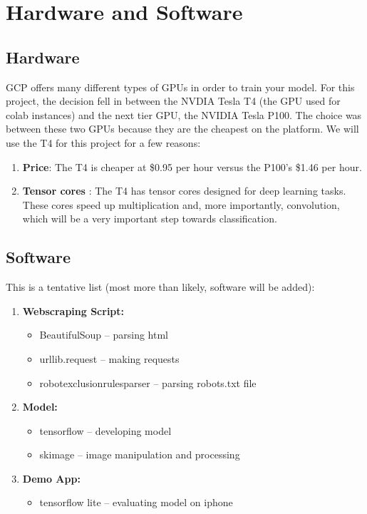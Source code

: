 \section*{Hardware and Software}
\subsection*{Hardware}
GCP offers many different types of GPUs in order to train your model. For this project, the decision fell in between 
the NVDIA Tesla T4 (the GPU used for colab instances) and the next tier GPU, the NVIDIA Tesla P100. The choice was between these 
two GPUs because they are the cheapest on the platform. We will use the T4 for this project for a few reasons:
\begin{enumerate}
  \item \textbf{Price}: The T4 is cheaper at \$0.95 per hour versus the P100's \$1.46 per hour.
  \item \textbf{Tensor cores} : The T4 has tensor cores designed for deep learning tasks. These cores speed up multiplication and, more importantly, 
        convolution, which will be a very important step towards classification. 
\end{enumerate} 

\subsection*{Software}
This is a tentative list (most more than likely, software will be added):
\begin{enumerate}
  \item \textbf{Webscraping Script:}
  \begin{itemize}
    \item BeautifulSoup -- parsing html
    \item urllib.request -- making requests
    \item robotexclusionrulesparser -- parsing robots.txt file
  \end{itemize}
  \item \textbf{Model:}
  \begin{itemize}
    \item tensorflow -- developing model
    \item skimage -- image manipulation and processing 
  \end{itemize}
  \item \textbf{Demo App:}
  \begin{itemize}
    \item tensorflow lite -- evaluating model on iphone
  \end{itemize}
\end{enumerate}

